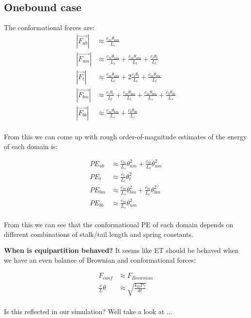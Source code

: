 \documentclass[10pt]{article} %
\begin{document}
\subsection{Onebound case}
The conformational forces are:\\
\begin{align*}
  |\vec{F_{ub}}| &\approx \frac{c_m\theta_{um}}{L_s}\\
  |\vec{F_{um}}| &\approx \frac{c_m\theta_{um}}{L_s} + \frac{c_m\theta_{um}}{L_t} + \frac{c_t\theta_{t}}{L_t}\\
  |\vec{F_{t}}| &\approx \frac{c_m\theta_{um}}{L_t} + 2\frac{c_t\theta_t}{L_t} + \frac{c_m\theta_{bm}}{L_t}\\
  |\vec{F_{bm}}| &\approx \frac{c_t\theta_t}{L_t} + \frac{c_m\theta_{bm}}{L_t} + \frac{c_m\theta_{bm}}{L_s} + \frac{c_b\theta_{bb}}{L_s}\\
  |\vec{F_{bb}}| &\approx \frac{c_m\theta_{bm}}{L_s} + \frac{c_b\theta_{bb}}{L_s}\\
\end{align*}

From this we can come up with rough order-of-magnitude estimates of the energy of each domain is:

\begin{align*}
  PE_{ub} &\approx \frac{c_m}{L_s}\theta_{um}^2 + \frac{c_m}{L_t}\theta_{um}^2\\
  PE_{t} &\approx \frac{c_t}{L_t}\theta_{t}^2\\
  PE_{bm} &\approx \frac{c_m}{L_s}\theta_{bm}^2 + \frac{c_m}{L_t}\theta_{bm}^2\\
  PE_{bb} &\approx \frac{c_m}{L_s}\theta_{um}^2\\
\end{align*}

From this we can see that the conformational PE of each domain depends on different combinations of
stalk/tail length and spring constants.

\textbf{When is equipartition behaved?}
It seems like ET should be behaved when we have an even balance of Brownian and conformational forces:

\begin{align*}
  F_{conf} &\approx F_{Brownian}\\
  \frac{c}{L}\theta &\approx \sqrt{\frac{k_BT\gamma}{dt}}\\
\end{align*}

Is this reflected in our simulation? Well take a look at %
...
\end{document}
